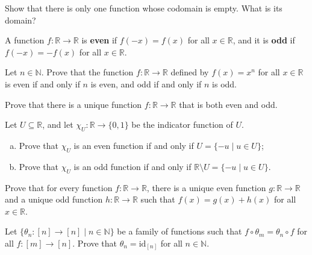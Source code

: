 \begin{chapex}
Show that there is only one function whose codomain is empty. What is its domain?
\end{chapex}

\begin{definition}
\label{defEvenOddFunction}
A function $f : \mathbb{R} \to \mathbb{R}$ is \textbf{even} if $f(-x)=f(x)$ for all $x \in \mathbb{R}$, and it is \textbf{odd} if $f(-x)=-f(x)$ for all $x \in \mathbb{R}$.
\end{definition}

\begin{chapex}
Let $n \in \mathbb{N}$. Prove that the function $f : \mathbb{R} \to \mathbb{R}$ defined by $f(x)=x^n$ for all $x \in \mathbb{R}$ is even if and only if $n$ is even, and odd if and only if $n$ is odd.
\end{chapex}

\begin{chapex}
Prove that there is a unique function $f : \mathbb{R} \to \mathbb{R}$ that is both even and odd.
\end{chapex}

\begin{chapex}
Let $U \subseteq \mathbb{R}$, and let $\chi_U : \mathbb{R} \to \{0,1\}$ be the indicator function of $U$.
\begin{enumerate}[(a)]
\item Prove that $\chi_U$ is an even function if and only if $U = \{ -u \mid u \in U \}$;
\item Prove that $\chi_U$ is an odd function if and only if $\mathbb{R} \setminus U = \{ -u \mid u \in U \}$.
\end{enumerate}
\end{chapex}

\begin{chapex}
Prove that for every function $f : \mathbb{R} \to \mathbb{R}$, there is a unique even function $g : \mathbb{R} \to \mathbb{R}$ and a unique odd function $h : \mathbb{R} \to \mathbb{R}$ such that $f(x)=g(x)+h(x)$ for all $x \in \mathbb{R}$.
\end{chapex}

\begin{chapex}
Let $\{ \theta_n : [n] \to [n] \mid n \in \mathbb{N} \}$ be a family of functions such that $f \circ \theta_m = \theta_n \circ f$ for all $f : [m] \to [n]$. Prove that $\theta_n = \mathrm{id}_{[n]}$ for all $n \in \mathbb{N}$.
\end{chapex}

